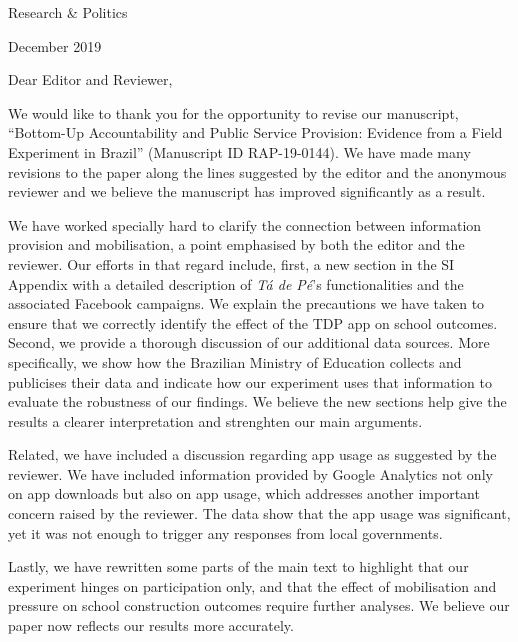 \documentclass[12pt,a4paper,]{article}
\date{}
\begin{document}


\noindent Research \& Politics

\vspace{.1cm}

 December 2019

\vspace{.5cm}

\noindent Dear Editor and Reviewer,

\vspace{.5cm}

\noindent We would like to thank you for the opportunity to revise our
manuscript, ``Bottom-Up Accountability and Public Service Provision:
Evidence from a Field Experiment in Brazil'' (Manuscript ID
RAP-19-0144). We have made many revisions to the paper along the lines
suggested by the editor and the anonymous reviewer and we believe the
manuscript has improved significantly as a result.

We have worked specially hard to clarify the connection between
information provision and mobilisation, a point emphasised by both the
editor and the reviewer. Our efforts in that regard include, first, a
new section in the SI Appendix with a detailed description of \emph{Tá
de Pé}'s functionalities and the associated Facebook campaigns. We
explain the precautions we have taken to ensure that we correctly
identify the effect of the TDP app on school outcomes. Second, we
provide a thorough discussion of our additional data sources. More
specifically, we show how the Brazilian Ministry of Education collects
and publicises their data and indicate how our experiment uses that
information to evaluate the robustness of our findings. We believe the
new sections help give the results a clearer interpretation and
strenghten our main arguments.

Related, we have included a discussion regarding app usage as suggested
by the reviewer. We have included information provided by Google
Analytics not only on app downloads but also on app usage, which
addresses another important concern raised by the reviewer. The data
show that the app usage was significant, yet it was not enough to
trigger any responses from local governments.

Lastly, we have rewritten some parts of the main text to highlight that
our experiment hinges on participation only, and that the effect of
mobilisation and pressure on school construction outcomes require
further analyses. We believe our paper now reflects our results more
accurately.
\end{document}

